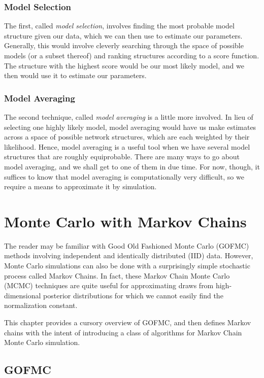 \documentclass[12pt,twoside]{reedthesis}
\begin{document}
	\subsection*{Model Selection}	
	The first, called {\em model selection}, involves finding the most probable model structure given our data, which we can then use to estimate our parameters. Generally, this would involve cleverly searching through the space of possible models (or a subset thereof) and ranking structures according to a score function. The structure with the highest score would be our most likely model, and we then would use it to estimate our parameters.  
	
	\subsection*{Model Averaging}
	The second technique, called {\em model averaging} is a little more involved. In lieu of selecting one highly likely model, model averaging would have us make estimates across a space of possible network structures, which are each weighted by their likelihood. Hence, model averaging is a useful tool when we have several model structures that are roughly equiprobable. There are many ways to go about model averaging, and we shall get to one of them in due time. For now, though, it suffices to know that model averaging is computationally very difficult, so we require a means to approximate it by simulation.
	
\chapter{Monte Carlo with Markov Chains}
	The reader may be familiar with Good Old Fashioned Monte Carlo (GOFMC) methods involving independent and identically distributed (IID) data. However, Monte Carlo simulations can also be done with a surprisingly simple stochastic process called Markov Chains. In fact, these Markov Chain Monte Carlo (MCMC) techniques are quite useful for approximating draws from high-dimensional posterior distributions for which we cannot easily find the normalization constant. 
	
	This chapter provides a cursory overview of GOFMC, and then defines Markov chains with the intent of introducing a class of algorithms for Markov Chain Monte Carlo simulation.
	\section{GOFMC}
\end{document}
